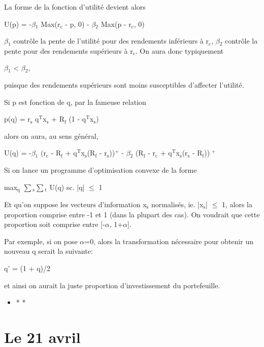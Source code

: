\documentclass[11pt]{article}
\begin{document}
La forme de la fonction d'utilité devient alors

U(p) = -$\beta$$_{\text{1}}$ Max(r$_{\text{c}}$ - p, 0) - $\beta$$_{\text{2}}$ Max(p - r$_{\text{c}}$, 0)

$\beta$$_{\text{1}}$ contrôle la pente de l'utilité pour des rendements inférieurs à r$_{\text{c}}$, $\beta$$_{\text{2}}$ contrôle la
pente pour des rendements supérieurs à r$_{\text{c}}$. On aura donc typiquement 

$\beta$$_{\text{1}}$ < $\beta$$_{\text{2}}$,

puisque des rendements supérieurs sont moins susceptibles d'affecter l'utilité.

Si p est fonction de q, par la fameuse relation

p(q) = r$_{\text{s}}$ q$^{\text{T}}$x$_{\text{s}}$ + R$_{\text{f}}$ (1 - q$^{\text{T}}$x$_{\text{s}}$)

alors on aura, au sens général, 

U(q) = -$\beta$$_{\text{1}}$ (r$_{\text{c}}$ - R$_{\text{f}}$ + q$^{\text{T}}$x$_{\text{s}}$(R$_{\text{f}}$ - r$_{\text{s}}$))$^{\text{+}}$ - $\beta$$_{\text{2}}$ (R$_{\text{f}}$ - r$_{\text{c}}$ + q$^{\text{T}}$x$_{\text{s}}$(r$_{\text{s}}$ - R$_{\text{f}}$))$^{\text{ +}}$

Si on lance un programme d'optimisation convexe de la forme

max$_{\text{q}}$ $\sum$$_{\text{s}}$$\sum$$_{\text{t}}$ U(q)
 sc. |q| $\le$ 1

Et qu'on suppose les vecteurs d'information x$_{\text{s}}$ normalisés, ie. |x$_{\text{s}}$| $\le$ 1, alors la
proportion comprise entre -1 et 1 (dans la plupart des cas). On voudrait que cette
proportion soit comprise entre [-$\alpha$, 1+$\alpha$].

Par exemple, si on pose $\alpha$=0, alors la transformation nécessaire pour obtenir un nouveau q
serait la suivante:

q' = (1 + q)/2

et ainsi on aurait la juste proportion d'investissement du portefeuille. 


\begin{itemize}
\item * *
\end{itemize}


\section{\textbf{Le 21 avril}}
\label{sec-3}
\end{document}

